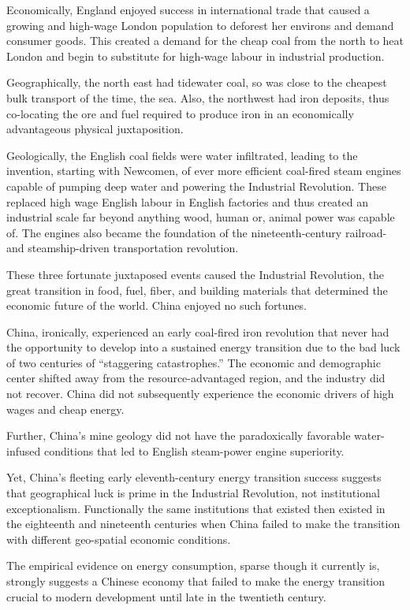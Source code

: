 \documentclass[12pt]{article}
\numberwithin{equation}{section}
\begin{document}
	Economically, England enjoyed success in international trade that caused a growing and high-wage London population to deforest her environs and demand consumer goods. This created a demand for the cheap coal from the north to heat London and begin to substitute for high-wage labour in industrial production.
	
	Geographically, the north east had tidewater coal, so was close to the cheapest bulk transport of the time, the sea. Also, the northwest had iron deposits, thus co-locating the ore and fuel required to produce iron in an economically advantageous physical juxtaposition. 
	
	Geologically, the English coal fields were water infiltrated, leading to the invention, starting with Newcomen, of ever more efficient coal-fired steam engines capable of pumping deep water and powering the Industrial Revolution. These replaced high wage English labour in English factories and thus created an industrial scale far beyond anything wood, human or, animal power was capable of. The engines also became the foundation of the nineteenth-century railroad- and steamship-driven transportation revolution.
	
	These three fortunate juxtaposed events caused the Industrial Revolution, the great transition in food, fuel, fiber, and building materials that determined the economic future of the world. China enjoyed no such fortunes.
	
	China, ironically, experienced an early coal-fired iron revolution that never had the opportunity to develop into a sustained energy transition due to the bad luck of two centuries of ``staggering catastrophes.'' The economic and demographic center shifted away from the resource-advantaged region, and the industry did not recover. China did not subsequently experience the economic drivers of high wages and cheap energy.
	
	Further, China's mine geology did not have the paradoxically favorable water-infused conditions that led to English steam-power engine superiority.
	
	Yet, China's fleeting early eleventh-century energy transition success suggests that geographical luck is prime in the Industrial Revolution, not institutional exceptionalism. Functionally the same institutions that existed then existed in the eighteenth and nineteenth centuries when China failed to make the transition with different geo-spatial economic conditions.
	
	The empirical evidence on energy consumption, sparse though it currently is, strongly suggests a Chinese economy that failed to make the energy transition crucial to modern development until late in the twentieth century.
\end{document}
